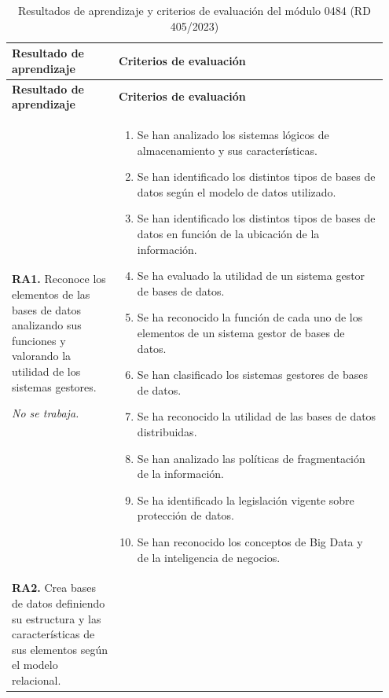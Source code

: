\documentclass[11pt,a4paper]{article}
\begin{document}
\begin{longtable}{@{}p{0.27\linewidth}p{0.68\linewidth}@{}}
\caption{Resultados de aprendizaje y criterios de evaluación del módulo 0484 (RD 405/2023)}
\label{tab:ra}\\
\toprule
\textbf{Resultado de aprendizaje} & \textbf{Criterios de evaluación} \\
\midrule
\endfirsthead
\toprule
\textbf{Resultado de aprendizaje} & \textbf{Criterios de evaluación} \\
\midrule
\endhead
\bottomrule
\endfoot
\textbf{RA1.} Reconoce los elementos de las bases de datos analizando sus funciones y
valorando la utilidad de los sistemas gestores.

\smallskip\emph{No se trabaja.}
&
\begin{enumerate}[label=\alph*), leftmargin=*, nosep]
  \item Se han analizado los sistemas lógicos de almacenamiento y sus características.
  \item Se han identificado los distintos tipos de bases de datos según el modelo de datos
        utilizado.
  \item Se han identificado los distintos tipos de bases de datos en función de la
        ubicación de la información.
  \item Se ha evaluado la utilidad de un sistema gestor de bases de datos.
  \item Se ha reconocido la función de cada uno de los elementos de un sistema gestor de
        bases de datos.
  \item Se han clasificado los sistemas gestores de bases de datos.
  \item Se ha reconocido la utilidad de las bases de datos distribuidas.
  \item Se han analizado las políticas de fragmentación de la información.
  \item Se ha identificado la legislación vigente sobre protección de datos.
  \item Se han reconocido los conceptos de Big Data y de la inteligencia de negocios.
\end{enumerate} \\
\midrule
\textbf{RA2.} Crea bases de datos definiendo su estructura y las características de sus
elementos según el modelo relacional.


\end{longtable}
\end{document}
